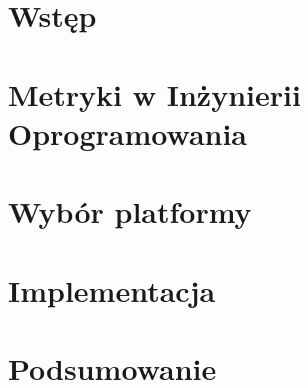 \chapter*{Wstęp}
\thispagestyle{empty}




\chapter{Metryki w Inżynierii Oprogramowania}




\chapter{Wybór platformy}

\chapter{Implementacja}


\chapter{Podsumowanie}

